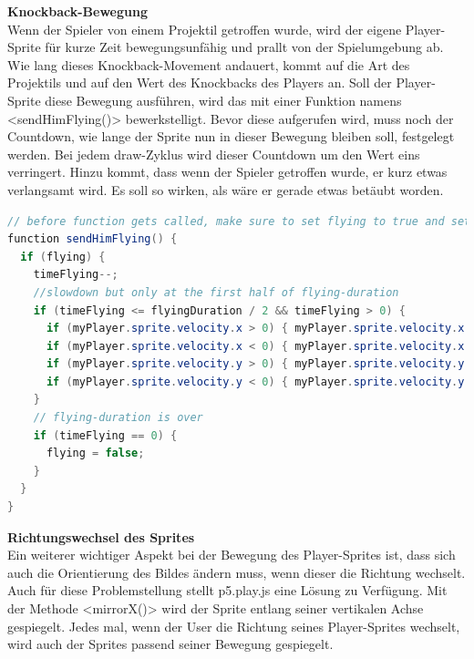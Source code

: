 \textbf{Knockback-Bewegung} \\
Wenn der Spieler von einem Projektil getroffen wurde, wird der eigene Player-Sprite für kurze Zeit bewegungsunfähig und prallt von der Spielumgebung ab.
Wie lang dieses Knockback-Movement andauert, kommt auf die Art des Projektils und auf den Wert des Knockbacks des Players an.
Soll der Player-Sprite diese Bewegung ausführen, wird das mit einer Funktion namens <sendHimFlying()> bewerkstelligt.
Bevor diese aufgerufen wird, muss noch der Countdown, wie lange der Sprite nun in dieser Bewegung bleiben soll, festgelegt werden. Bei jedem draw-Zyklus wird dieser Countdown um den Wert eins verringert.
Hinzu kommt, dass wenn der Spieler getroffen wurde, er kurz etwas verlangsamt wird. Es soll so wirken, als wäre er gerade etwas betäubt worden.
\begin{lstlisting}[caption=Knockback-Bewegung,language=Java,label=lst:impl:knockbackMov]
// before function gets called, make sure to set flying to true and set a flying-duration
function sendHimFlying() {
  if (flying) {
    timeFlying--;
    //slowdown but only at the first half of flying-duration
    if (timeFlying <= flyingDuration / 2 && timeFlying > 0) {
      if (myPlayer.sprite.velocity.x > 0) { myPlayer.sprite.velocity.x -= 0.3; }
      if (myPlayer.sprite.velocity.x < 0) { myPlayer.sprite.velocity.x += 0.3; }
      if (myPlayer.sprite.velocity.y > 0) { myPlayer.sprite.velocity.y -= 0.3; }
      if (myPlayer.sprite.velocity.y < 0) { myPlayer.sprite.velocity.y += 0.3; }
    }
    // flying-duration is over
    if (timeFlying == 0) {
      flying = false;
    }
  }
}
\end{lstlisting}


\textbf{Richtungswechsel des Sprites} \label{directionChange}
\\
Ein weiterer wichtiger Aspekt bei der Bewegung des Player-Sprites ist, dass sich auch die Orientierung des Bildes ändern muss, wenn dieser die Richtung wechselt.
Auch für diese Problemstellung stellt p5.play.js eine Lösung zu Verfügung. Mit der Methode <mirrorX()> wird der Sprite entlang seiner vertikalen Achse gespiegelt.
Jedes mal, wenn der User die Richtung seines Player-Sprites wechselt, wird auch der Sprites passend seiner Bewegung gespiegelt.

